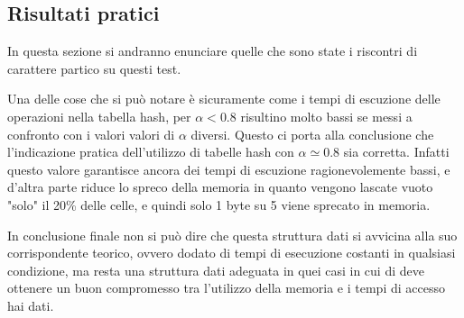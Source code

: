 \documentclass{article}
\begin{document}
\subsection{Risultati pratici}
In questa sezione si andranno enunciare quelle che sono state i riscontri di carattere partico su questi test.

Una delle cose che si può notare è sicuramente come i tempi di escuzione delle operazioni nella tabella hash, per $\alpha < 0.8$ risultino molto bassi se messi a confronto con i valori valori di $\alpha$ diversi. Questo ci porta alla conclusione che l'indicazione pratica dell'utilizzo di tabelle hash con $\alpha \simeq 0.8$ sia corretta. Infatti questo valore garantisce ancora dei tempi di escuzione ragionevolemente bassi, e d'altra parte riduce lo spreco della memoria in quanto vengono lascate vuoto "solo" il 20\% delle celle, e quindi solo 1 byte su 5 viene sprecato in memoria.

In conclusione finale non si può dire che questa struttura dati si avvicina alla suo corrispondente teorico, ovvero dodato di tempi di esecuzione costanti in qualsiasi condizione, ma resta una struttura dati adeguata in quei casi in cui di deve ottenere un buon compromesso tra l'utilizzo della memoria e i tempi di accesso hai dati.

\newpage

\listoffigures
\listoftables
\end{document}
